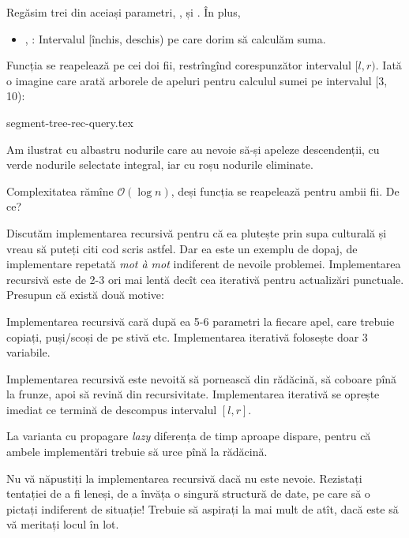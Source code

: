 Regăsim trei din aceiași parametri, ,  și . În plus,

\begin{itemize}
  \item {}, : Intervalul [închis, deschis) pe care dorim să calculăm suma.
\end{itemize}

Funcția se reapelează pe cei doi fii, restrîngînd corespunzător intervalul $[l, r)$. Iată o imagine care arată arborele de apeluri pentru calculul sumei pe intervalul [3, 10):

{segment-tree-rec-query.tex}

Am ilustrat cu albastru nodurile care au nevoie să-și apeleze descendenții, cu verde nodurile selectate integral, iar cu roșu nodurile eliminate.

Complexitatea rămîne $\mathcal{O}(\log n)$, deși funcția se reapelează pentru ambii fii. De ce?

Discutăm implementarea recursivă pentru că ea plutește prin supa culturală și vreau să puteți citi cod scris astfel. Dar ea este un exemplu de dopaj, de implementare repetată \textit{mot à mot} indiferent de nevoile problemei. Implementarea recursivă este de 2-3 ori mai lentă decît cea iterativă pentru actualizări punctuale. Presupun că există două motive:

Implementarea recursivă cară după ea 5-6 parametri la fiecare apel, care trebuie copiați, puși/scoși de pe stivă etc. Implementarea iterativă folosește doar 3 variabile.

Implementarea recursivă este nevoită să pornească din rădăcină, să coboare pînă la frunze, apoi să revină din recursivitate. Implementarea iterativă se oprește imediat ce termină de descompus intervalul $[l,r]$.

La varianta cu propagare \textit{lazy} diferența de timp aproape dispare, pentru că ambele implementări trebuie să urce pînă la rădăcină.

Nu vă năpustiți la implementarea recursivă dacă nu este nevoie. Rezistați tentației de a fi leneși, de a învăța o singură structură de date, pe care să o pictați indiferent de situație! Trebuie să aspirați la mai mult de atît, dacă este să vă meritați locul în lot.
